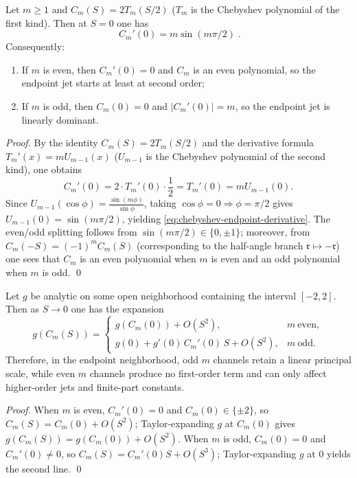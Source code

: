 \begin{proposition}\label{prop:chebyshev-endpoint-derivative-splitting}
Let \(m\ge 1\) and \(C_m(S)=2T_m(S/2)\) (\(T_m\) is the Chebyshev polynomial of the first kind).
Then at \(S=0\) one has
\begin{equation}\label{eq:chebyshev-endpoint-derivative}
\boxed{\;
C_m'(0)=m\sin(m\pi/2)\; }.
\end{equation}
Consequently:
\begin{enumerate}
  \item If \(m\) is even, then \(C_m'(0)=0\) and \(C_m\) is an even polynomial, so the endpoint jet starts at least at second order;
  \item If \(m\) is odd, then \(C_m(0)=0\) and \(|C_m'(0)|=m\), so the endpoint jet is linearly dominant.
\end{enumerate}
\end{proposition}
\begin{proof}
By the identity \(C_m(S)=2T_m(S/2)\) and the derivative formula \(T_m'(x)=mU_{m-1}(x)\) (\(U_{m-1}\) is the Chebyshev polynomial of the second kind), one obtains
\[
C_m'(0)=2\cdot T_m'(0)\cdot \frac12=T_m'(0)=mU_{m-1}(0).
\]
Since \(U_{m-1}(\cos\phi)=\frac{\sin(m\phi)}{\sin\phi}\), taking \(\cos\phi=0\Rightarrow \phi=\pi/2\) gives \(U_{m-1}(0)=\sin(m\pi/2)\), yielding \eqref{eq:chebyshev-endpoint-derivative}.
The even/odd splitting follows from \(\sin(m\pi/2)\in\{0,\pm 1\}\); moreover, from \(C_m(-S)=(-1)^m C_m(S)\) (corresponding to the half-angle branch \(\mathfrak{r}\mapsto-\mathfrak{r}\)) one sees that \(C_m\) is an even polynomial when \(m\) is even and an odd polynomial when \(m\) is odd. \qed
\end{proof}

\begin{corollary}\label{cor:chebyshev-endpoint-jet-regularization}
Let \(g\) be analytic on some open neighborhood containing the interval \([-2,2]\).
Then as \(S\to 0\) one has the expansion
\[
g(C_m(S))=
\begin{cases}
g(C_m(0)) + O(S^2), & m\ \text{even},\\[4pt]
g(0) + g'(0)\,C_m'(0)\,S+O(S^2), & m\ \text{odd}.
\end{cases}
\]
Therefore, in the endpoint neighborhood, odd \(m\) channels retain a linear principal scale, while even \(m\) channels produce no first-order term and can only affect higher-order jets and finite-part constants.
\end{corollary}
\begin{proof}
When \(m\) is even, \(C_m'(0)=0\) and \(C_m(0)\in\{\pm 2\}\), so \(C_m(S)=C_m(0)+O(S^2)\); Taylor-expanding \(g\) at \(C_m(0)\) gives \(g(C_m(S))=g(C_m(0))+O(S^2)\).
When \(m\) is odd, \(C_m(0)=0\) and \(C_m'(0)\neq 0\), so \(C_m(S)=C_m'(0)S+O(S^3)\); Taylor-expanding \(g\) at \(0\) yields the second line. \qed
\end{proof}

